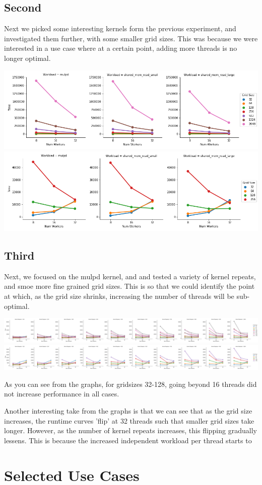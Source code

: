 \subsection{Second}

Next we picked some interesting kernels form the previous experiment, and investigated them further, with some smaller grid sizes. This was because we were interested in a use case where at a certain point, adding more threads is no longer optimal.

\includegraphics[width=1\textwidth]{graphics/focustest2_1.png}
\includegraphics[width=1\textwidth]{graphics/focustest2_2.png}

\subsection{Third}

Next, we focused on the mulpd kernel, and and tested a variety of kernel repeats, and smoe more fine grained grid sizes. This is so that we could identify the point at which, as the grid size shrinks, increasing the number of threads will be sub-optimal.

\includegraphics[width=1\textwidth]{graphics/focustest3_1.png}
\includegraphics[width=1\textwidth]{graphics/focustest3_2.png}

As you can see from the graphs, for gridsizes 32-128, going beyond 16 threads did not increase performance in all cases.

Another interesting take from the graphs is that we can see that as the grid size increases, the runtime curves 'flip' at 32 threads such that smaller grid sizes take longer. However, as the number of kernel repeats increases, this flipping gradually lessens. This is because the increased independent workload per thread starts to 

\section{Selected Use Cases}